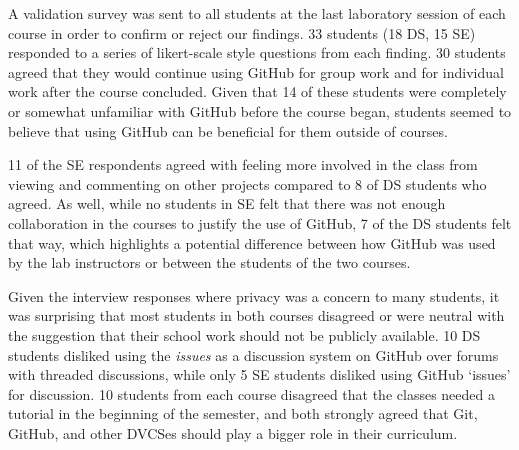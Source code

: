 A validation survey was sent to all students at the last laboratory session of each course in order to confirm or reject our findings. 33 students (18 DS, 15 SE) responded to a series of likert-scale style questions from each finding. 30 students agreed that they would continue using GitHub for group work and for individual work after the course concluded. Given that 14 of these students were completely or somewhat unfamiliar with GitHub before the course began, students seemed to believe that using GitHub can be beneficial for them outside of courses.

11 of the SE respondents agreed with feeling more involved in the class from viewing and commenting on other projects compared to 8 of DS students who agreed. As well, while no students in SE felt that there was not enough collaboration in the courses to justify the use of GitHub, 7 of the DS students felt that way, which highlights a potential difference between how GitHub was used by the lab instructors or between the students of the two courses. %

Given the interview responses where privacy was a concern to many students, it was surprising that most students in both courses disagreed or were neutral with the suggestion that their school work should not be publicly available. 10 DS students disliked using the \emph{issues} as a discussion system on GitHub over forums with threaded discussions, while only 5 SE students disliked using GitHub `issues' for discussion. 10 students from each course disagreed that the classes needed a tutorial in the beginning of the semester, and both strongly agreed that Git, GitHub, and other DVCSes should play a bigger role in their curriculum.








